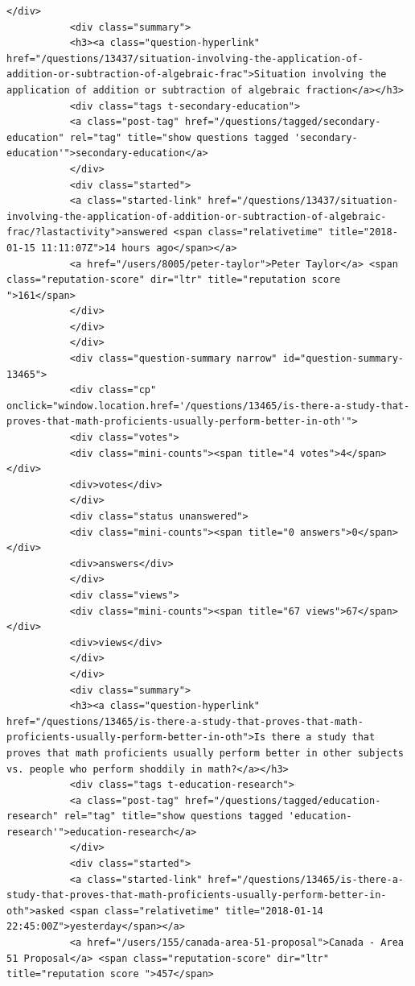\documentclass[11pt]{article}
\begin{document}
\begin{Verbatim}[commandchars=\\\{\}]
           </div>
           <div class="summary">
           <h3><a class="question-hyperlink" href="/questions/13437/situation-involving-the-application-of-addition-or-subtraction-of-algebraic-frac">Situation involving the application of addition or subtraction of algebraic fraction</a></h3>
           <div class="tags t-secondary-education">
           <a class="post-tag" href="/questions/tagged/secondary-education" rel="tag" title="show questions tagged 'secondary-education'">secondary-education</a>
           </div>
           <div class="started">
           <a class="started-link" href="/questions/13437/situation-involving-the-application-of-addition-or-subtraction-of-algebraic-frac/?lastactivity">answered <span class="relativetime" title="2018-01-15 11:11:07Z">14 hours ago</span></a>
           <a href="/users/8005/peter-taylor">Peter Taylor</a> <span class="reputation-score" dir="ltr" title="reputation score ">161</span>
           </div>
           </div>
           </div>
           <div class="question-summary narrow" id="question-summary-13465">
           <div class="cp" onclick="window.location.href='/questions/13465/is-there-a-study-that-proves-that-math-proficients-usually-perform-better-in-oth'">
           <div class="votes">
           <div class="mini-counts"><span title="4 votes">4</span></div>
           <div>votes</div>
           </div>
           <div class="status unanswered">
           <div class="mini-counts"><span title="0 answers">0</span></div>
           <div>answers</div>
           </div>
           <div class="views">
           <div class="mini-counts"><span title="67 views">67</span></div>
           <div>views</div>
           </div>
           </div>
           <div class="summary">
           <h3><a class="question-hyperlink" href="/questions/13465/is-there-a-study-that-proves-that-math-proficients-usually-perform-better-in-oth">Is there a study that proves that math proficients usually perform better in other subjects vs. people who perform shoddily in math?</a></h3>
           <div class="tags t-education-research">
           <a class="post-tag" href="/questions/tagged/education-research" rel="tag" title="show questions tagged 'education-research'">education-research</a>
           </div>
           <div class="started">
           <a class="started-link" href="/questions/13465/is-there-a-study-that-proves-that-math-proficients-usually-perform-better-in-oth">asked <span class="relativetime" title="2018-01-14 22:45:00Z">yesterday</span></a>
           <a href="/users/155/canada-area-51-proposal">Canada - Area 51 Proposal</a> <span class="reputation-score" dir="ltr" title="reputation score ">457</span>

\end{Verbatim}
\end{document}
